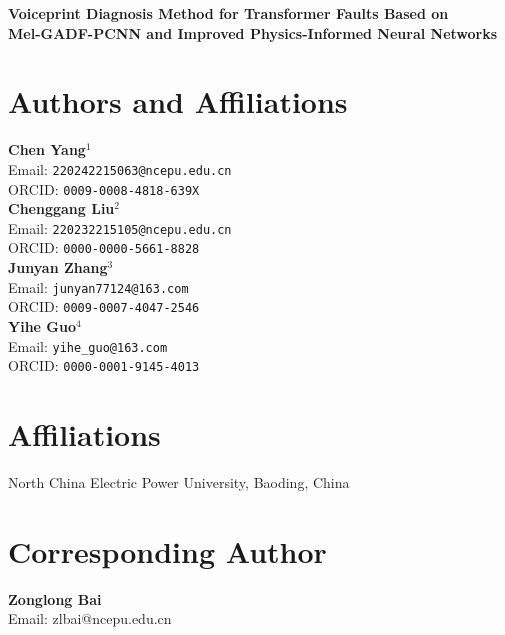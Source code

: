 \documentclass[12pt]{article}
\begin{document}
	

	
	\begin{center}
		\Large \textbf{
			Voiceprint Diagnosis Method for Transformer Faults Based on\\
			Mel-GADF-PCNN and Improved Physics-Informed Neural Networks
		}
	\end{center}
	
	\vspace{1.5em}

	
\section*{Authors and Affiliations}

\textbf{Chen Yang}$^{1}$\\
Email: \texttt{220242215063@ncepu.edu.cn}\\
ORCID: \texttt{0009-0008-4818-639X}\\[1.5em]
\textbf{Chenggang Liu}$^{2}$\\
Email: \texttt{220232215105@ncepu.edu.cn}\\
ORCID: \texttt{0000-0000-5661-8828}\\[1.5em]
\textbf{Junyan Zhang}$^{3}$\\
Email: \texttt{junyan77124@163.com}\\
ORCID: \texttt{0009-0007-4047-2546}\\[1.5em]
\textbf{Yihe Guo}$^{4}$\\
Email: \texttt{yihe\_guo@163.com}\\
ORCID: \texttt{0000-0001-9145-4013}\\[1.5em]

	\section*{Affiliations}
	
	North China Electric Power University, Baoding, China 
	
	\vspace{1.5em}
	
	
	\section*{Corresponding Author}
	
	\textbf{Zonglong Bai} \\
	Email: zlbai@ncepu.edu.cn
	 \\
	
	\vspace{1.5em}
	
\end{document}
